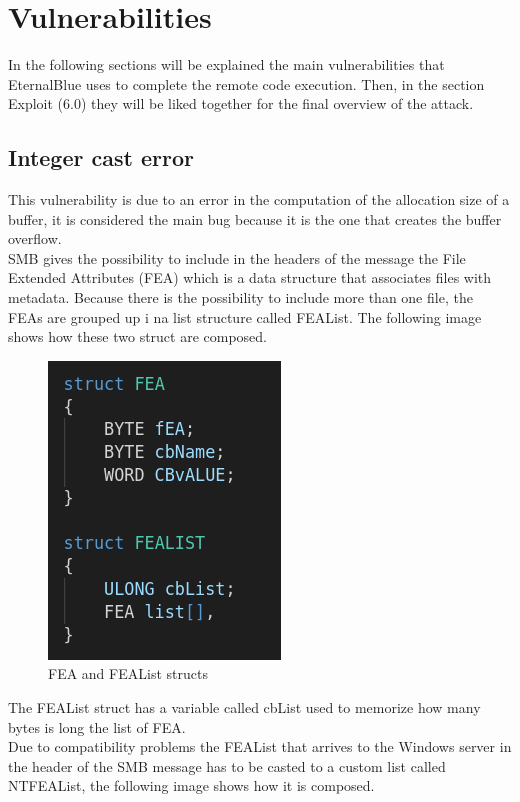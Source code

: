 \section{Vulnerabilities}
In the following sections will be explained the main vulnerabilities that EternalBlue uses to complete the remote code execution. 
Then, in the section Exploit (6.0) they will be liked together for the final overview of the attack.

\subsection{Integer cast error}
This vulnerability is due to an error in the computation of the allocation size of a buffer, it is considered the main bug because it is the one that creates the buffer overflow.\\
SMB gives the possibility to include in the headers of the message the File Extended Attributes (FEA) which is a data structure that 
associates files with metadata. Because there is the possibility to include more than one file, the FEAs are grouped up i na list structure called FEAList.
The following image shows how these two struct are composed.

\begin{figure}[ht!]
  \centering
    \includegraphics[scale=0.5]{images/FEA_code.png}
    \caption{FEA and FEAList structs}
\end{figure}
\noindent The FEAList struct has a variable called cbList used to memorize how many bytes is long the list of FEA.\\
Due to compatibility problems the FEAList that arrives to the Windows server in the header of the SMB message has to be casted to 
a custom list called NTFEAList, the following image shows how it is composed.

